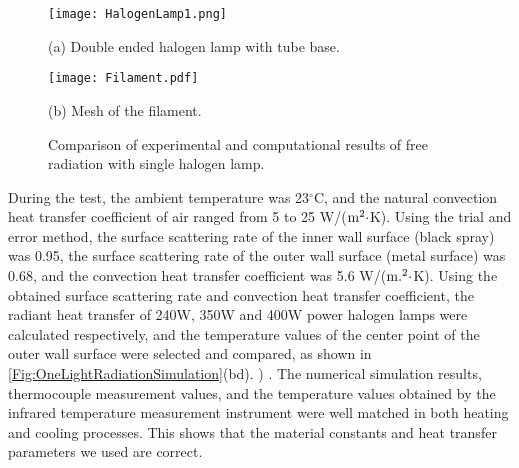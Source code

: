 \begin{figure}
  \begin{minipage}[t]{0.5\linewidth} %
  \nonumber
    \centering
    \texttt{[image: HalogenLamp1.png]}
    \centerline{(a) Double ended halogen lamp with tube base.}
    \label{Fig:HalogenLamp1}
  \end{minipage}%
  \begin{minipage}[t]{0.5\linewidth}
    \centering
    \texttt{[image: Filament.pdf]}
    \centerline{(b) Mesh of the filament.}
  \end{minipage}
  \caption{Comparison of experimental and computational results of free radiation with single halogen lamp.}
  \label{Fig:Filament}
\end{figure}


During the test, the ambient temperature was 23$^{\circ}$C, and the natural convection heat transfer coefficient of air ranged from 5 to 25 W/(${\rm{m}}^2\cdot$K).
Using the trial and error method, the surface scattering rate of the inner wall surface (black spray) was 0.95, the surface scattering rate of the outer wall surface (metal surface) was 0.68, and the convection heat transfer coefficient was 5.6 W/(${\rm{m}}. ^2\cdot$K).
Using the obtained surface scattering rate and convection heat transfer coefficient, the radiant heat transfer of 240W, 350W and 400W power halogen lamps were calculated respectively, and the temperature values of the center point of the outer wall surface were selected and compared, as shown in \ref{Fig:OneLightRadiationSimulation}(bd). ) .
The numerical simulation results, thermocouple measurement values, and the temperature values obtained by the infrared temperature measurement instrument were well matched in both heating and cooling processes. This shows that the material constants and heat transfer parameters we used are correct.


